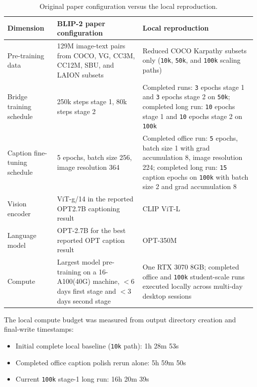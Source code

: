 \documentclass[11pt]{article}
\begin{document}
\begin{table}[t]
\centering
\small
\begin{tabularx}{\textwidth}{p{3.3cm} Y Y}
\toprule
Dimension & BLIP-2 paper configuration & Local reproduction \\
\midrule
Pre-training data & 129M image-text pairs from COCO, VG, CC3M, CC12M, SBU, and LAION subsets \citep{li2023blip2} & Reduced COCO Karpathy subsets only (\texttt{10k}, \texttt{50k}, and \texttt{100k} scaling paths) \\
Bridge training schedule & 250k steps stage 1, 80k steps stage 2 \citep{li2023blip2} & Completed runs: \texttt{3} epochs stage 1 and \texttt{3} epochs stage 2 on \texttt{50k}; completed long run: \texttt{10} epochs stage 1 and \texttt{10} epochs stage 2 on \texttt{100k} \\
Caption fine-tuning schedule & 5 epochs, batch size 256, image resolution 364 \citep{li2023blip2} & Completed office run: \texttt{5} epochs, batch size 1 with grad accumulation 8, image resolution 224; completed long run: \texttt{15} caption epochs on \texttt{100k} with batch size 2 and grad accumulation 8 \\
Vision encoder & ViT-g/14 in the reported OPT2.7B captioning result \citep{li2023blip2} & CLIP ViT-L \\
Language model & OPT-2.7B for the best reported OPT caption result \citep{li2023blip2} & OPT-350M \\
Compute & Largest model pre-training on a 16-A100(40G) machine, $<$6 days first stage and $<$3 days second stage \citep{li2023blip2} & One RTX 3070 8GB; completed office and \texttt{100k} student-scale runs executed locally across multi-day desktop sessions \\
\bottomrule
\end{tabularx}
\caption{Original paper configuration versus the local reproduction.}
\label{tab:setup-compare}
\end{table}

The local compute budget was measured from output directory creation and final-write timestamps:
\begin{itemize}
\item Initial complete local baseline (\texttt{10k} path): 1h 28m 53s
\item Completed office caption polish rerun alone: 5h 59m 50s
\item Current \texttt{100k} stage-1 long run: 16h 20m 39s
\end{itemize}
\end{document}
